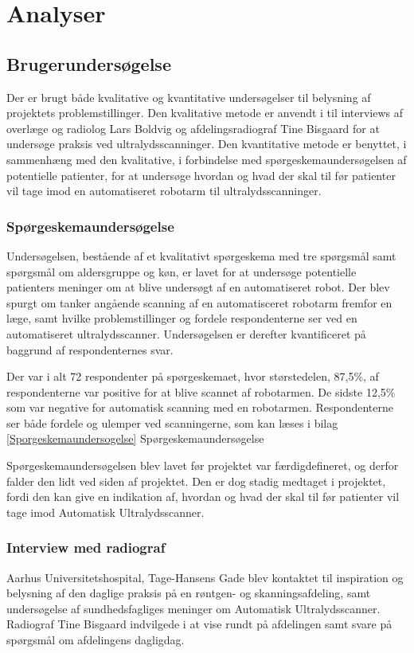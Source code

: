 \chapter{Analyser}\label{Analyser}

\section{Brugerundersøgelse}
Der er brugt både kvalitative og kvantitative undersøgelser til belysning af projektets problemstillinger. Den kvalitative metode er anvendt i til interviews af overlæge og radiolog Lars Boldvig og afdelingsradiograf Tine Bisgaard for at undersøge praksis ved ultralydsscanninger. Den kvantitative metode  er benyttet, i sammenhæng med den kvalitative, i forbindelse med spørgeskemaundersøgelsen af potentielle patienter, for at undersøge hvordan og hvad der skal til før patienter vil tage imod en automatiseret robotarm til ultralydsscanninger.  

\subsection{Spørgeskemaundersøgelse}
Undersøgelsen, bestående af et kvalitativt spørgeskema med tre spørgsmål samt spørgsmål om aldersgruppe og køn, er lavet for at undersøge potentielle patienters meninger om at blive undersøgt af en automatiseret robot. Der blev spurgt om tanker angående scanning af en automatisceret  robotarm fremfor en læge, samt hvilke problemstillinger og fordele respondenterne ser ved en automatiseret ultralydsscanner. Undersøgelsen er derefter kvantificeret på baggrund af respondenternes svar. 

Der var i alt 72 respondenter på spørgeskemaet, hvor størstedelen, 87,5\%, af respondenterne var positive for at blive scannet af robotarmen. De sidste 12,5\% som var negative for automatisk scanning med en robotarmen. Respondenterne ser både fordele og ulemper ved scanningerne, som kan læses i bilag \ref{Sporgeskemaundersogelse} Spørgeskemaundersøgelse

Spørgeskemaundersøgelsen blev lavet før projektet var færdigdefineret, og derfor falder den lidt ved siden af projektet. Den er dog stadig medtaget i projektet, fordi den kan give en indikation af, hvordan og hvad der skal til før patienter vil tage imod Automatisk Ultralydsscanner. 

\subsection{Interview med radiograf} 
Aarhus Universitetshospital, Tage-Hansens Gade blev kontaktet til inspiration og belysning af den daglige praksis på en røntgen- og skanningsafdeling, samt undersøgelse af sundhedsfagliges meninger om Automatisk Ultralydsscanner. Radiograf Tine Bisgaard indvilgede i at vise rundt på afdelingen samt svare på spørgsmål om afdelingens dagligdag. 

